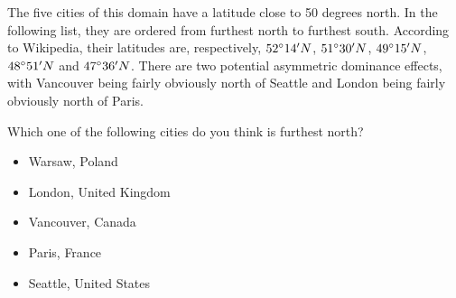 The five cities of this domain have a latitude close to 50 degrees north.
In the following list, they are ordered from furthest north to furthest south.
According to Wikipedia, their latitudes are, respectively, $52\degree14^\prime N$, $51\degree30^\prime N$, $49\degree15^\prime N$, $48\degree51^\prime N$ and $47\degree36^\prime N$.
There are two potential asymmetric dominance effects, with Vancouver being fairly obviously north of Seattle and London being fairly obviously north of Paris.

\begin{tcolorbox}
Which one of the following cities do you think is furthest north?

\begin{itemize}
	\setlength\itemsep{-5pt}
	\item Warsaw, Poland
	\item London, United Kingdom
	\item Vancouver, Canada
	\item Paris, France
	\item Seattle, United States
\end{itemize}
\end{tcolorbox}
